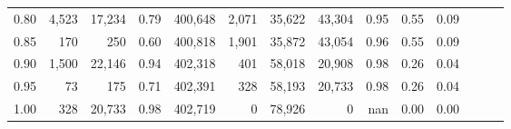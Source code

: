 \begin{tabular}{rrrrrrrrrrrrrr}
0.80 &   4,523 &  17,234 &  0.79 &  400,648 &    2,071 &  35,622 &  43,304 &  0.95 &  0.55 &      0.09 \\
0.85 &     170 &     250 &  0.60 &  400,818 &    1,901 &  35,872 &  43,054 &  0.96 &  0.55 &      0.09 \\
0.90 &   1,500 &  22,146 &  0.94 &  402,318 &      401 &  58,018 &  20,908 &  0.98 &  0.26 &      0.04 \\
0.95 &      73 &     175 &  0.71 &  402,391 &      328 &  58,193 &  20,733 &  0.98 &  0.26 &      0.04 \\
1.00 &     328 &  20,733 &  0.98 &  402,719 &        0 &  78,926 &       0 &   nan &  0.00 &      0.00 \\
\bottomrule
\end{tabular}
